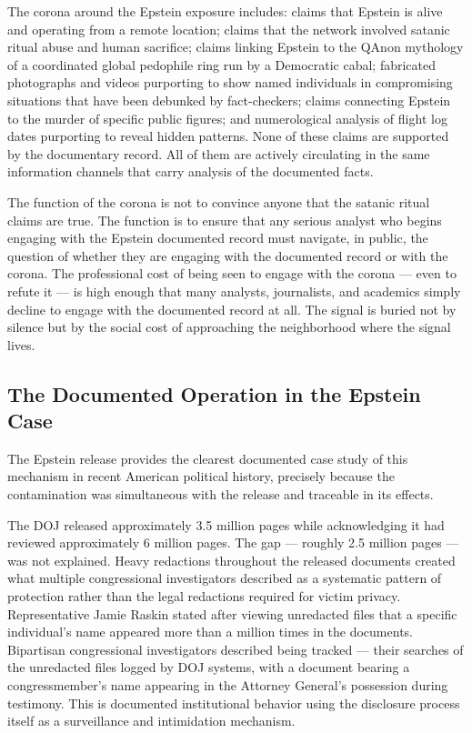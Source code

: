 \documentclass[11pt,a4paper]{article}
\begin{document}
The corona around the Epstein exposure includes: claims that Epstein is alive and operating from a remote location; claims that the network involved satanic ritual abuse and human sacrifice; claims linking Epstein to the QAnon mythology of a coordinated global pedophile ring run by a Democratic cabal; fabricated photographs and videos purporting to show named individuals in compromising situations that have been debunked by fact-checkers; claims connecting Epstein to the murder of specific public figures; and numerological analysis of flight log dates purporting to reveal hidden patterns. None of these claims are supported by the documentary record. All of them are actively circulating in the same information channels that carry analysis of the documented facts.


The function of the corona is not to convince anyone that the satanic ritual claims are true. The function is to ensure that any serious analyst who begins engaging with the Epstein documented record must navigate, in public, the question of whether they are engaging with the documented record or with the corona. The professional cost of being seen to engage with the corona — even to refute it — is high enough that many analysts, journalists, and academics simply decline to engage with the documented record at all. The signal is buried not by silence but by the social cost of approaching the neighborhood where the signal lives.


\subsection{The Documented Operation in the Epstein Case}

The Epstein release provides the clearest documented case study of this mechanism in recent American political history, precisely because the contamination was simultaneous with the release and traceable in its effects.


The DOJ released approximately 3.5 million pages while acknowledging it had reviewed approximately 6 million pages. The gap — roughly 2.5 million pages — was not explained. Heavy redactions throughout the released documents created what multiple congressional investigators described as a systematic pattern of protection rather than the legal redactions required for victim privacy. Representative Jamie Raskin stated after viewing unredacted files that a specific individual's name appeared more than a million times in the documents. Bipartisan congressional investigators described being tracked — their searches of the unredacted files logged by DOJ systems, with a document bearing a congressmember's name appearing in the Attorney General's possession during testimony. This is documented institutional behavior using the disclosure process itself as a surveillance and intimidation mechanism.
\end{document}
